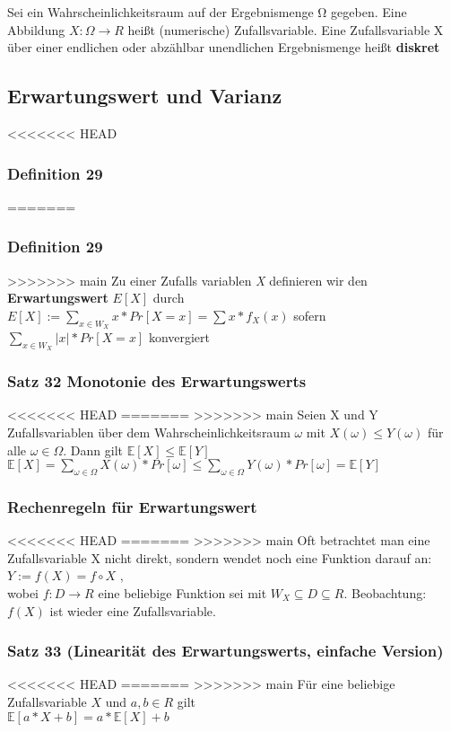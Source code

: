 \documentclass[11pt]{article}
\begin{document}
\begin{enumerate}
Sei ein Wahrscheinlichkeitsraum auf der Ergebnismenge Ω gegeben. Eine Abbildung \(X : \Omega \rightarrow R\) heißt (numerische) Zufallsvariable.
Eine Zufallsvariable X über einer endlichen oder abzählbar unendlichen Ergebnismenge heißt \textbf{diskret}


\subsection{Erwartungswert und Varianz}
<<<<<<< HEAD
\label{sec:orga776bc8}
\subsubsection{Definition 29}
\label{sec:org2f68425}
=======
\label{sec:orgd206b48}
\subsubsection{Definition 29}
\label{sec:org74a595a}
>>>>>>> main
Zu einer Zufalls variablen \emph{X} definieren wir den \textbf{Erwartungswert} \(E[X]\) durch
\(E[X] := \sum_{x\in W_X} x \ast Pr[X = x] = \sum x \ast f_X(x)\)
sofern \(\sum_{x\in W_X} |x| \ast Pr[X = x]\) konvergiert

\subsubsection{Satz 32 Monotonie des Erwartungswerts}
<<<<<<< HEAD
\label{sec:org83999c8}
=======
\label{sec:orgbea872f}
>>>>>>> main
Seien X und Y Zufallsvariablen über dem Wahrscheinlichkeitsraum \(\omega\) mit \(X(\omega) \leq Y(\omega)\) für alle \(\omega \in \Omega\). Dann gilt \(\mathbb{E}[X] \leq \mathbb{E}[Y]\)
\(\mathbb{E}[X] = \sum_{\omega \in \Omega} X(\omega) * Pr[\omega] \leq \sum_{\omega \in \Omega} Y(\omega) * Pr[\omega] = \mathbb{E}[Y]\)

\subsubsection{Rechenregeln für Erwartungswert}
<<<<<<< HEAD
\label{sec:org6994e77}
=======
\label{sec:orgae9ac87}
>>>>>>> main
Oft betrachtet man eine Zufallsvariable X nicht direkt, sondern wendet noch eine Funktion darauf an:
\(Y := f(X) = f \circ X\) , \\
wobei \(f : D \rightarrow R\) eine beliebige Funktion sei mit \(W_X \subseteq D \subseteq R\).
Beobachtung: \(f(X)\) ist wieder eine Zufallsvariable.

\subsubsection{Satz 33 (Linearität des Erwartungswerts, einfache Version)}
<<<<<<< HEAD
\label{sec:orgf647737}
=======
\label{sec:org532a192}
>>>>>>> main
Für eine beliebige Zufallsvariable \(X\) und \(a, b \in R\) gilt\\
\(\mathbb{E}[a * X + b] = a * \mathbb{E}[X] + b\)


\end{enumerate}
\end{document}
